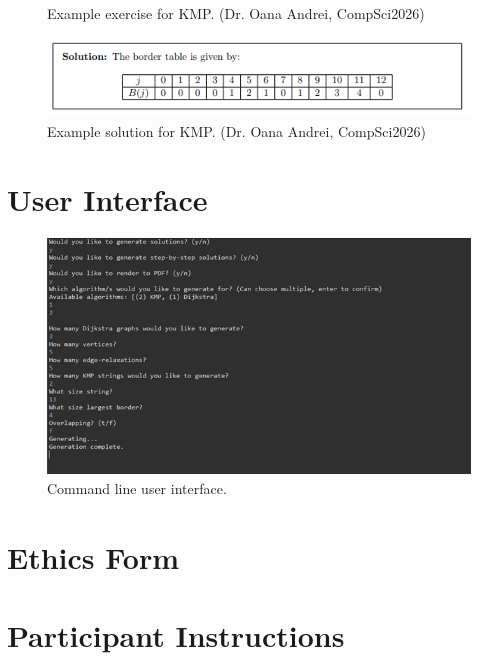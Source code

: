 \documentclass{l4proj}
\begin{document}
\begin{appendices}
\begin{figure}[h]
    \caption{Example exercise for KMP. (Dr. Oana Andrei, CompSci2026)}
    \label{fig:kmp_example_exercise} 
\end{figure}

\begin{figure}[h]
    \centering
    \includegraphics[width=0.9\linewidth]{images/kmp_example_solution}    

    \caption{Example solution for KMP. (Dr. Oana Andrei, CompSci2026)}
    \label{fig:kmp_example_solution} 
\end{figure}

\chapter{User Interface}
\label{chap:user_interface}

\begin{figure}[h]
    \centering
    \includegraphics[width=0.99\linewidth]{images/user_interface}    

    \caption{Command line user interface.}
    \label{fig:user_interface} 
\end{figure}

\chapter{Ethics Form}
\label{chap:ethics_form}



\chapter{Participant Instructions}
\label{chap:participant_instructions}


\end{appendices}
\end{document}
